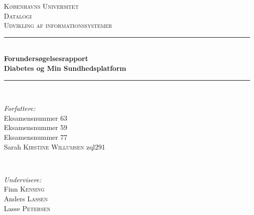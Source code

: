 \documentclass[12pt]{article}                                                        %
\begin{document}
	
	\begin{titlepage}
		
		\newcommand{\HRule}{\rule{\linewidth}{0.5mm}} %
		
		\center %
		
		
		\textsc{\Large Københavns Universitet}\\[1.5cm] %
		\textsc{\large Datalogi}\\[0.5cm] %
		\textsc{\normalsize Udvikling af informationssystemer}\\[0.5cm] %
		
		
		\HRule \\[0.4cm]
		{ \LARGE \bfseries Forundersøgelsesrapport\\Diabetes og Min Sundhedsplatform}\\[0.4cm] %
		\HRule \\[1.5cm]
		
		
		\begin{minipage}{0.4\textwidth}
			\begin{flushleft} \normalsize
				\emph{Forfattere:}\\ 
				Eksamensnummer 63\\
				Eksamensnummer 59\\
				Eksamensnummer 77\\
				Sarah \textsc{Kirstine Willumsen} zql291\\
			\end{flushleft}
		\end{minipage}
		~
		\begin{minipage}{0.4\textwidth}
			\begin{flushright} \normalsize
				\emph{Undervisere:} \\
				Finn \textsc{Kensing}\\ %
				Anders \textsc{Lassen}\\
				Lasse \textsc{Petersen}\\
				\hfill \\
			\end{flushright}
		\end{minipage}\\[2cm]
		

\end{titlepage}
\end{document}

